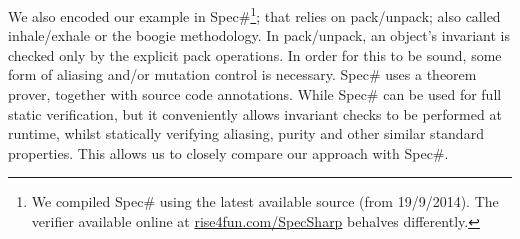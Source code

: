 




We also encoded our example in Spec\#\footnote{We compiled Spec\# using the latest available source (from 19/9/2014). The verifier available online at \url{rise4fun.com/SpecSharp} behalves differently.}; that relies on pack/unpack; also called inhale/exhale or the boogie methodology.
In pack/unpack, an object's invariant is checked only by the explicit pack operations.
In order for this to be sound, some form of aliasing and/or mutation control is necessary. Spec\# uses a theorem prover, together with source code annotations.
While Spec\# can be used for full static verification, but it conveniently allows invariant checks to be performed at runtime, whilst statically verifying aliasing, purity and other similar standard properties.
This allows us to closely compare our approach with Spec\#.

